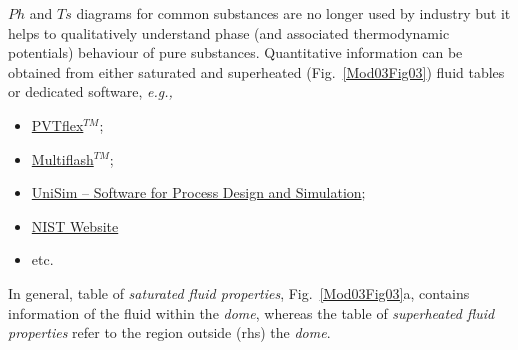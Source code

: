 \documentclass[12pts,a4paper,amsmath,amssymb,floatfix]{article}%
\newcommand{\eg}{{\it e.g., }}
\begin{document}
 $Ph$ and $Ts$ diagrams for common substances are no longer used by industry but it helps to qualitatively understand phase (and associated thermodynamic potentials) behaviour of pure substances. Quantitative information can be obtained from either saturated and superheated (Fig.~\ref{Mod03Fig03}) fluid tables or dedicated software, \eg
\begin{itemize}
   \item \href{http://www.weatherford.com/doc/wft183650}{PVTflex$^{TM}$};
   \item \href{http://www.kbcat.com/infochem-software/flow-assurance-software-multiflash/pvt-simulation}{Multiflash$^{TM}$};
   \item \href{https://www.honeywellprocess.com/en-US/explore/products/advanced-applications/unisim/Pages/default.aspx}{UniSim – Software for Process Design and Simulation};
   \item \href{http://webbook.nist.gov/chemistry/fluid/}{NIST Website}
   \item etc.
\end{itemize}
In general, table of {\it saturated fluid properties}, Fig.~\ref{Mod03Fig03}a, contains information of the fluid within the {\it dome}, whereas the table of {\it superheated fluid properties} refer to the region outside (rhs) the {\it dome}. 
%
\end{document}

